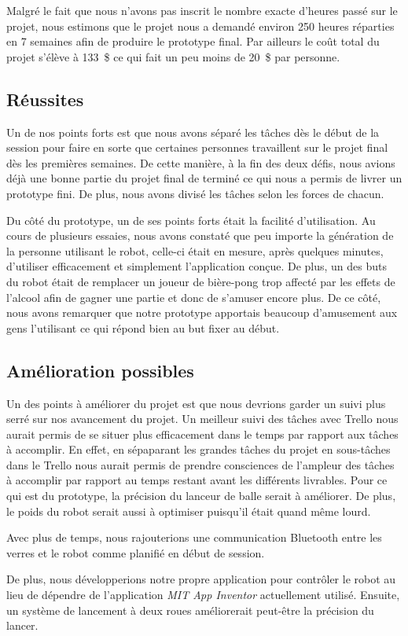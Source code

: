 Malgré le fait que nous n'avons pas inscrit le nombre exacte d'heures passé sur le projet, nous estimons que le projet nous a demandé environ 250 heures réparties en 7 semaines afin de produire le prototype final.
Par ailleurs le coût total du projet s'élève à 133~\$ ce qui fait un peu moins de 20~\$ par personne.

\subsection{Réussites}

Un de nos points forts est que nous avons séparé les tâches dès le début de la session pour faire en sorte que certaines personnes travaillent sur le projet final dès les premières semaines.
De cette manière, à la fin des deux défis, nous avions déjà une bonne partie du projet final de terminé ce qui nous a permis de livrer un prototype fini.
De plus, nous avons divisé les tâches selon les forces de chacun.

Du côté du prototype, un de ses points forts était la facilité d'utilisation.
Au cours de plusieurs essaies, nous avons constaté que peu importe la génération de la personne utilisant le robot, celle-ci était en mesure, après quelques minutes, d'utiliser efficacement et simplement l'application conçue.
De plus, un des buts du robot était de remplacer un joueur de bière-pong trop affecté par les effets de l'alcool afin de gagner une partie et donc de s'amuser encore plus.
De ce côté, nous avons remarquer que notre prototype apportais beaucoup d'amusement aux gens l'utilisant ce qui répond bien au but fixer au début.

\subsection{Amélioration possibles}

Un des points à améliorer du projet est que nous devrions garder un suivi plus serré sur nos avancement du projet.
Un meilleur suivi des tâches avec Trello nous aurait permis de se situer plus efficacement dans le temps par rapport aux tâches à accomplir.
En effet, en sépaparant les grandes tâches du projet en sous-tâches dans le Trello nous aurait permis de prendre consciences de l'ampleur des tâches à accomplir par rapport au temps restant avant les différents livrables.
Pour ce qui est du prototype, la précision du lanceur de balle serait à améliorer.
De plus, le poids du robot serait aussi à optimiser puisqu'il était quand même lourd.

Avec plus de temps, nous rajouterions une communication Bluetooth entre les verres et le robot comme planifié en début de session.

De plus, nous développerions notre propre application pour contrôler le robot au lieu de dépendre de l’application \emph{MIT App Inventor} actuellement utilisé.
Ensuite, un système de lancement à deux roues améliorerait peut-être la précision du lancer.
